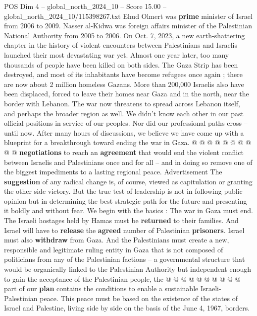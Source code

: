 \begin{textsample}{POS Dim 4 – global\_north\_2024\_10 – Score 15.00 – global\_north\_2024\_10/115398267.txt}  \label{ex:f4_pos_410}
Ehud Olmert was \textbf{prime} minister of Israel from 2006 to 2009.
Nasser al-Kidwa was foreign affairs minister of the Palestinian National Authority from 2005 to 2006.
On Oct. 7, 2023, a new earth-shattering chapter in the history of violent encounters between Palestinians and Israelis launched their most devastating war yet.
Almost one year later, too many thousands of people have been killed on both sides.
The Gaza Strip has been destroyed, and most of its inhabitants have become refugees once again ; there are now about 2 million homeless Gazans.
More than 200,000 Israelis also have been displaced, forced to leave their homes near Gaza and in the north, near the border with Lebanon.
The war now threatens to spread across Lebanon itself, and perhaps the broader region as well.
We didn't know each other in our past official positions in service of our peoples.
Nor did our professional paths cross -- until now.
After many hours of discussions, we believe we have come up with a blueprint for a breakthrough toward ending the war in Gaza. @ @ @ @ @ @ @ @ @ @ \textbf{negotiations} to reach an \textbf{agreement} that would end the violent conflict between Israelis and Palestinians once and for all -- and in doing so remove one of the biggest impediments to a lasting regional peace.
Advertisement The \textbf{suggestion} of any radical change is, of course, viewed as capitulation or granting the other side victory.
But the true test of leadership is not in following public opinion but in determining the best strategic path for the future and presenting it boldly and without fear.
We begin with the basics : The war in Gaza must end.
The Israeli hostages held by Hamas must be \textbf{returned} to their families.
And Israel will have to \textbf{release} the \textbf{agreed} number of Palestinian \textbf{prisoners}.
Israel must also \textbf{withdraw} from Gaza.
And the Palestinians must create a new, responsible and legitimate ruling entity in Gaza that is not composed of politicians from any of the Palestinian factions -- a governmental structure that would be organically linked to the Palestinian Authority but independent enough to gain the acceptance of the Palestinian people, the @ @ @ @ @ @ @ @ @ @ part of our \textbf{plan} contains the conditions to enable a sustainable Israeli-Palestinian peace.
This peace must be based on the existence of the states of Israel and Palestine, living side by side on the basis of the June 4, 1967, borders.

\end{textsample}
